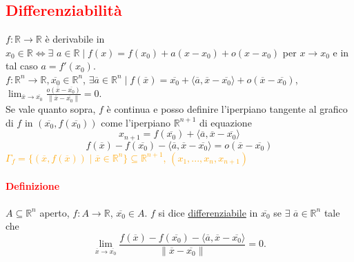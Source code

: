 \documentclass{article}
\newcommand{\R}{\mathbb{R}}
\begin{document}
\subsection{\textcolor{red}{Differenziabilità}}
$f:\R\rightarrow\R$ è derivabile in $x_0\in \R \Leftrightarrow \exists \,\, a \in \R \mid f(x)=f(x_0)+a(x-x_0)+o(x-x_0)$ per $x \rightarrow x_0$ e in tal caso $a=f'(x_0)$.\\
$f:\R^n\rightarrow\R, \overline{x_0}\in\R^n$, $\exists\overline{a}\in\R^n \mid f(\overline{x})=\overline{x_0}+ \langle \overline{a},\overline{x}-\overline{x_0} \rangle +o(\overline{x}-\overline{x_0})$, $\lim_{\overline{x}\rightarrow\overline{x_0}}\frac{o(\overline{x}-\overline{x_0})}{\|\overline{x}-\overline{x_0}\|}=0$.\\
Se vale quanto sopra, $f$ è continua e posso definire l'iperpiano tangente al grafico di $f$ in $(\overline{x_0},f(\overline{x_0}))$ come l'iperpiano $\R^{n+1}$ di equazione
\begin{equation*}
    x_{n+1}=f(\overline{x_0})+\langle \overline{a},\overline{x}-\overline{x_0}\rangle
\end{equation*}
\begin{equation*}
    f(\overline{x})-f(\overline{x_0})-\langle \overline{a},\overline{x}-\overline{x_0} \rangle=o(\overline{x}-\overline{x_0})
\end{equation*}
\textcolor{orange}{$\Gamma_f=\{(\overline{x},f(\overline{x}))\mid \overline{x} \in \R^n\}\subseteq\R^{n+1}$, $(x_1,...,x_n,x_{n+1})$}

\paragraph{\textcolor{red}{Definizione}}
$A\subseteq\R^n$ aperto, $f:A\rightarrow \R$, $\overline{x_0}\in A$. $f$ si dice \underline{differenziabile} in $\overline{x_0}$ se $\exists\,\, \overline{a}\in \R^n$ tale che
\begin{equation*}
    \lim_{\overline{x}\rightarrow\overline{x_0}}\frac{f(\overline{x})-f(\overline{x_0})-\langle \overline{a},\overline{x}-\overline{x_0}\rangle}{\|\overline{x}-\overline{x_0}\|}=0.
\end{equation*}
\end{document}
